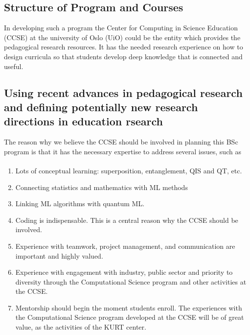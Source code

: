\documentclass[%
oneside,                 %
final,                   %
10pt]{article}
\begin{document}
\noindent



\subsection{Structure of Program and Courses}

In developing such a program 
the Center for Computing in Science Education (CCSE) at the university of Oslo (UiO) could be the entity which provides the pedagogical research resources. It has the needed research experience
on how to design curricula so that students develop deep knowledge that is connected and useful.

\subsection{Using recent advances in pedagogical research and defining potentially new research directions in education rsearch}

The reason why we believe the CCSE should be involved in planning this BSc program is that it has the necessary expertise to address several issues, such as


\paragraph{}
\begin{enumerate}
\item Lots of conceptual learning: superposition, entanglement, QIS and QT, etc. 

\item Connecting statistics and mathematics with ML methods

\item Linking ML algorithms with quantum ML.

\item Coding is indispensable. This is a central reason why the CCSE should be involved.

\item Experience with teamwork, project management, and communication are important and highly valued.

\item Experience with engagement with industry, public sector and priority to diversity through the Computational Science program and other activities at the CCSE.

\item Mentorship should begin the moment students enroll. The experiences with the Computational Science program developed at the CCSE will be of great value, as the activities of the KURT center.
\end{enumerate}
\end{document}
